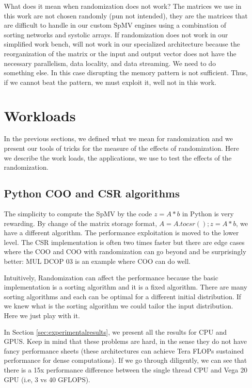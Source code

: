 \documentclass[manuscript,screen]{acmart}
\begin{document}

What does it mean when randomization does not work? The matrices we
use in this work are not chosen randomly (pun not intended), they are
the matrices that are difficult to handle in our custom SpMV engines
using a combination of sorting networks and systolic arrays. If
randomization does not work in our simplified work bench, will not
work in our specialized architecture because the reorganization of the
matrix or the input and output vector does not have the necessary
parallelism, data locality, and data streaming. We need to do
something else. In this case disrupting the memory pattern is not
sufficient. Thus, if we cannot beat the pattern, we must exploit it,
well not in this work.

\section{Workloads}
\label{sec:workload}

In the previous sections, we defined what we mean for randomization
and we present our tools of tricks for the measure of the effects of
randomization. Here we describe the work loads, the applications, we
use to test the effects of the randomization.

\subsection{Python COO and CSR algorithms}
\label{sec:pythoncoocsr}
The simplicity to compute the SpMV by the code $z = A*b$ in Python is
very rewarding. By change of the matrix storage format, $A =
A.tocsr(); z = A*b$, we have a different algorithm. The performance
exploitation is moved to the lower level.  The CSR implementation is
often two times faster but there are edge cases where the COO and COO
with randomization can go beyond and be surprisingly better: MUL DCOP
03 is an example where COO can do well.

Intuitively, Randomization can affect the performance because the
basic implementation is a sorting algorithm and it is a fixed
algorithm. There are many sorting algorithms and each can be optimal
for a different initial distribution. If we knew what is the sorting
algorithm we could tailor the input distribution. Here we just play
with it.

In Section \ref{sec:experimentalresults}, we present all the results
for CPU and GPUS. Keep in mind that these problems are hard, in the
sense they do not have fancy performance sheets (these architectures
can achieve Tera FLOPs sustained performance for dense computations).
If we go through diligently, we can see that there is a 15x
performance difference between the single thread CPU and Vega 20 GPU
(i.e, 3 vs 40 GFLOPS).
\end{document}
